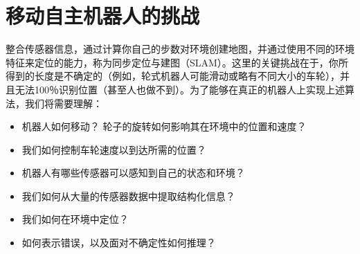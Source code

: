 \section{移动自主机器人的挑战}


整合传感器信息，通过计算你自己的步数对环境创建地图，并通过使用不同的环境特征来定位的能力，称为同步定位与建图（SLAM）。这里的关键挑战在于，你所得到的长度是不确定的（例如，轮式机器人可能滑动或略有不同大小的车轮），并且无法100％识别位置（甚至人也做不到）。为了能够在真正的机器人上实现上述算法，我们将需要理解：


\begin{itemize}
\item 机器人如何移动？ 轮子的旋转如何影响其在环境中的位置和速度？
\item 我们如何控制车轮速度以到达所需的位置？
\item 机器人有哪些传感器可以感知到自己的状态和环境？
\item 我们如何从大量的传感器数据中提取结构化信息？
\item 我们如何在环境中定位？
\item 如何表示错误，以及面对不确定性如何推理？
\end{itemize}

